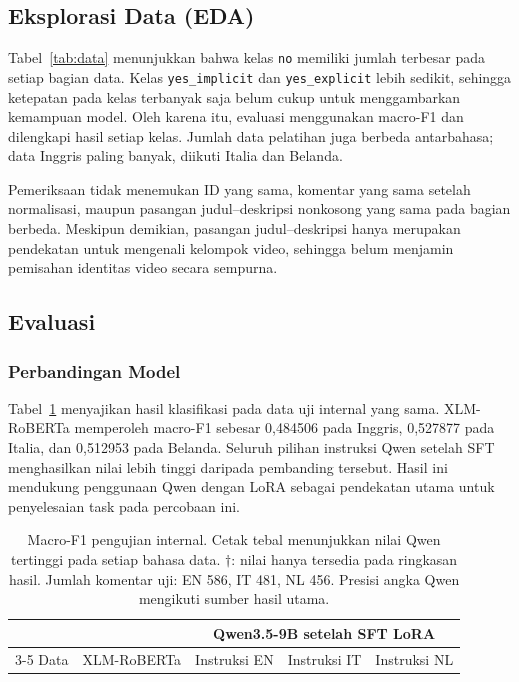 \documentclass[11pt]{article}
\begin{document}
\subsection{Eksplorasi Data (EDA)}
Tabel~\ref{tab:data} menunjukkan bahwa kelas \texttt{no} memiliki jumlah terbesar pada setiap bagian data. Kelas \texttt{yes\_implicit} dan \texttt{yes\_explicit} lebih sedikit, sehingga ketepatan pada kelas terbanyak saja belum cukup untuk menggambarkan kemampuan model. Oleh karena itu, evaluasi menggunakan macro-F1 dan dilengkapi hasil setiap kelas. Jumlah data pelatihan juga berbeda antarbahasa; data Inggris paling banyak, diikuti Italia dan Belanda.

Pemeriksaan tidak menemukan ID yang sama, komentar yang sama setelah normalisasi, maupun pasangan judul--deskripsi nonkosong yang sama pada bagian berbeda. Meskipun demikian, pasangan judul--deskripsi hanya merupakan pendekatan untuk mengenali kelompok video, sehingga belum menjamin pemisahan identitas video secara sempurna.

\subsection{Evaluasi}
\subsubsection{Perbandingan Model}
Tabel~\ref{tab:main} menyajikan hasil klasifikasi pada data uji internal yang sama. XLM-RoBERTa memperoleh macro-F1 sebesar 0,484506 pada Inggris, 0,527877 pada Italia, dan 0,512953 pada Belanda. Seluruh pilihan instruksi Qwen setelah SFT menghasilkan nilai lebih tinggi daripada pembanding tersebut. Hasil ini mendukung penggunaan Qwen dengan LoRA sebagai pendekatan utama untuk penyelesaian task pada percobaan ini.

\begin{table}[t]
\centering
\begin{tabular}{lrrrr}
\toprule
& & \multicolumn{3}{c}{Qwen3.5-9B setelah SFT LoRA} \\
\cmidrule(lr){3-5}
Data & XLM-RoBERTa & Instruksi EN & Instruksi IT & Instruksi NL \\
\midrule

\end{tabular}
\caption{Macro-F1 pengujian internal. Cetak tebal menunjukkan nilai Qwen tertinggi pada setiap bahasa data. $\dagger$: nilai hanya tersedia pada ringkasan hasil. Jumlah komentar uji: EN 586, IT 481, NL 456. Presisi angka Qwen mengikuti sumber hasil utama.}
\label{tab:main}
\end{table}
\end{document}
